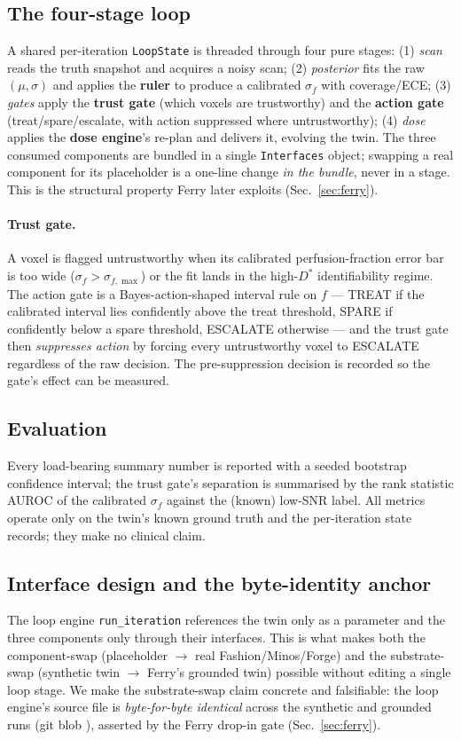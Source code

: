 \documentclass[12pt]{iopart}
\newcommand{\Dstar}{D^{*}}
\newcommand{\sigf}{\sigma_{f}}
\newcommand{\fq}{f}          %
\begin{document}
\subsection{The four-stage loop}\label{sec:loop}
A shared per-iteration \texttt{LoopState} is threaded through four pure stages:
(1) \emph{scan} reads the truth snapshot and acquires a noisy scan; (2) \emph{posterior}
fits the raw $(\mu,\sigma)$ and applies the \textbf{ruler} to produce a calibrated
$\sigf$ with coverage/ECE; (3) \emph{gates} apply the \textbf{trust gate} (which voxels
are trustworthy) and the \textbf{action gate} (treat/spare/escalate, with action
suppressed where untrustworthy); (4) \emph{dose} applies the \textbf{dose engine}'s
re-plan and delivers it, evolving the twin. The three consumed components are bundled in
a single \texttt{Interfaces} object; swapping a real component for its placeholder is a
one-line change \emph{in the bundle}, never in a stage. This is the structural property
Ferry later exploits (Sec.~\ref{sec:ferry}).

\paragraph{Trust gate.} A voxel is flagged untrustworthy when its calibrated
perfusion-fraction error bar is too wide ($\sigf > \sigma_{f,\max}$) or the fit lands in
the high-$\Dstar$ identifiability regime. The action gate is a Bayes-action-shaped
interval rule on $\fq$ --- TREAT if the calibrated interval lies confidently above the
treat threshold, SPARE if confidently below a spare threshold, ESCALATE otherwise --- and
the trust gate then \emph{suppresses action} by forcing every untrustworthy voxel to
ESCALATE regardless of the raw decision. The pre-suppression decision is recorded so the
gate's effect can be measured.

\subsection{Evaluation}
Every load-bearing summary number is reported with a seeded bootstrap confidence interval;
the trust gate's separation is summarised by the rank statistic AUROC of the calibrated
$\sigf$ against the (known) low-SNR label. All metrics operate only on the twin's known
ground truth and the per-iteration state records; they make no clinical claim.

\subsection{Interface design and the byte-identity anchor}\label{sec:byte}
The loop engine \texttt{run\_iteration} references the twin only as a parameter and the
three components only through their interfaces. This is what makes both the
component-swap (placeholder $\rightarrow$ real Fashion/Minos/Forge) and the
substrate-swap (synthetic twin $\rightarrow$ Ferry's grounded twin) possible without
editing a single loop stage. We make the substrate-swap claim concrete and falsifiable:
the loop engine's source file is \emph{byte-for-byte identical} across the synthetic and
grounded runs (git blob \texttt{\numLoopBlob}), asserted by the Ferry drop-in gate
(Sec.~\ref{sec:ferry}).
\end{document}
